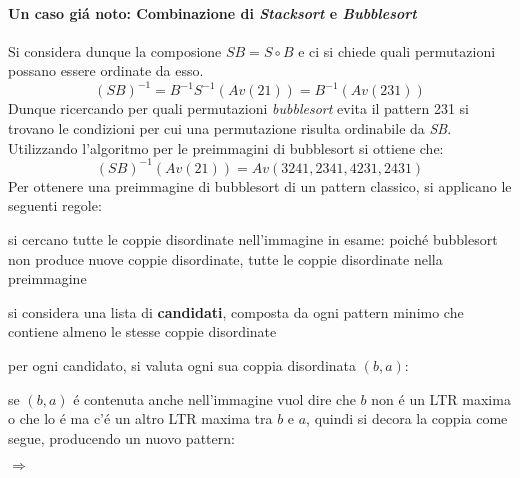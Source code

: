 \paragraph*{Un caso gi\'a noto: Combinazione di \textit{Stacksort} e \textit{Bubblesort}} Si considera dunque la composione $SB = S\circ{B}$ e ci si chiede quali permutazioni possano essere ordinate da esso.$$(SB)^{-1}=B^{-1}S^{-1}(Av(21))=B^{-1}(Av(231))$$
Dunque ricercando per quali permutazioni \textit{bubblesort} evita il pattern 231 si trovano le condizioni per cui una permutazione risulta ordinabile da \textit{SB}.\\
Utilizzando l'algoritmo per le preimmagini di bubblesort\cite{albert2010inverse} si ottiene che:$$(SB)^{-1}(Av(21))=Av(3241, 2341, 4231, 2431)$$
Per ottenere una preimmagine di bubblesort di un pattern classico, si applicano le seguenti regole:
\begin{description}
	\item si cercano tutte le coppie disordinate nell'immagine in esame: poich\'e bubblesort non produce nuove coppie disordinate, tutte le coppie disordinate nella preimmagine
	\item si considera una lista di \textbf{candidati}, composta da ogni pattern minimo che contiene almeno le stesse coppie disordinate 
	\item per ogni candidato, si valuta ogni sua coppia disordinata $(b,a)$:
	\item se $(b,a)$ \'e contenuta anche nell'immagine vuol dire che $b$ non \'e un LTR maxima o che lo \'e ma c'\'e un altro LTR maxima tra $b$ e $a$, quindi si decora la coppia come segue, producendo un nuovo pattern:
	\begin{center}
		$\Rightarrow$
	\end{center}
\end{description}
